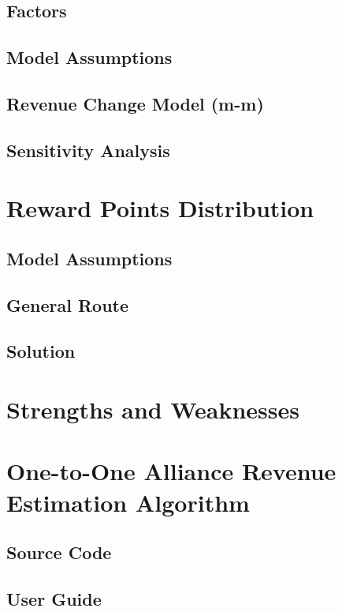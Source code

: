 	\subsection{Factors}
	
	\subsection{Model Assumptions}
	
	\subsection{Revenue Change Model (m-m)}
	
	\subsection{Sensitivity Analysis}
	
	
	\section{Reward Points Distribution}
	\subsection{Model Assumptions}
	
	\subsection{General Route}
	
	\subsection{Solution}
	
	
	\section{Strengths and Weaknesses}
	
	
	\pagebreak
	\appendix
	\section{One-to-One Alliance Revenue Estimation Algorithm}
	\subsection{Source Code}
	
	\subsection{User Guide}
	
